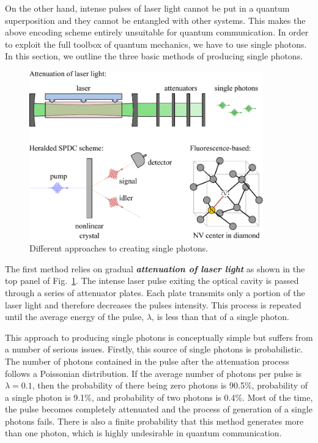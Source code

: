 On the other hand, intense pulses of laser light cannot be put in a quantum superposition and they cannot be entangled with other systems.
This makes the above encoding scheme entirely unsuitable for quantum communication.
In order to exploit the full toolbox of quantum mechanics, we have to use single photons.
In this section, we outline the three basic methods of producing single photons.

\begin{figure}
    \centering
    \includegraphics[width=0.9\textwidth]{lesson5/5-5_single_photons.pdf}
    \caption[Single photon sources]{Different approaches to creating single photons.}
    \label{fig:5-5_single_photons}
\end{figure}

The first method relies on gradual \textit{\textbf{attenuation of laser light}} as shown in
the top panel of Fig.~\ref{fig:5-5_single_photons}.
The intense laser pulse exiting the optical cavity is passed through a series of attenuator plates.
Each plate transmits only a portion of the laser light and therefore decreases the pulses intensity.
This process is repeated until the average energy of the pulse, $\lambda$, is less than that of a single photon.

This approach to producing single photons is conceptually simple but suffers from a number of serious issues.
Firstly, this source of single photons is probabilistic.
The number of photons contained in the pulse after the attenuation process follows a Poissonian distribution.
If the average number of photons per pulse is $\lambda = 0.1$, then the probability of there being zero photons is 90.5\%, probability of a single photon is 9.1\%, and probability of two photons is 0.4\%.
Most of the time, the pulse becomes completely attenuated and the process of generation of a single photons fails.
There is also a finite probability that this method generates more than one photon, which is highly undesirable in quantum communication.

